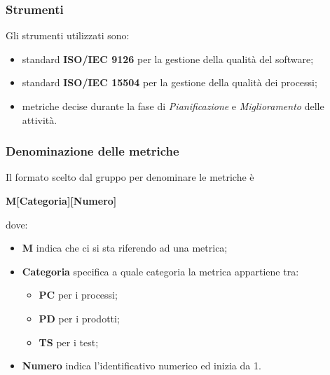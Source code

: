 \subsubsection{Strumenti}
Gli strumenti utilizzati sono:
\begin{itemize}
	\item standard \textbf{ISO/IEC 9126} per la gestione della qualità del software;
	\item standard \textbf{ISO/IEC 15504} per la gestione della qualità dei processi;
	\item metriche decise durante la fase di \textit{Pianificazione} e \textit{Miglioramento} delle attività.
\end{itemize}

\subsubsection{Denominazione delle metriche}
Il formato scelto dal gruppo per denominare le metriche è
\begin{center}
	\textbf{M[Categoria][Numero]}
\end{center}
dove:
\begin{itemize}
\item \textbf{M} indica che ci si sta riferendo ad una metrica;
\item \textbf{Categoria} specifica a quale categoria la metrica appartiene tra:
	\begin{itemize}
	\item \textbf{PC} per i processi;
	\item \textbf{PD} per i prodotti;
	\item \textbf{TS} per i test;
	\end{itemize}
\item \textbf{Numero} indica l'identificativo numerico ed inizia da 1.
\end{itemize}